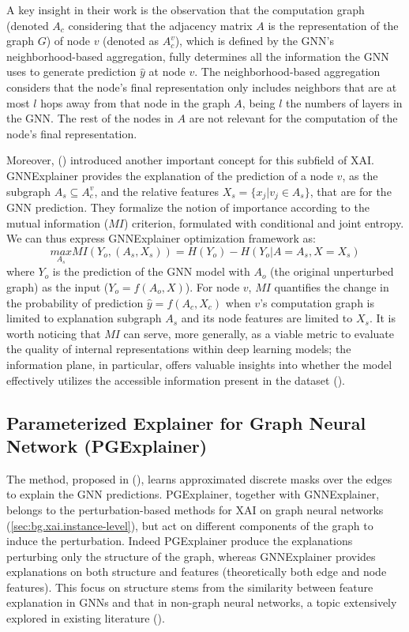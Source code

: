 \documentclass[binding=0.6cm]{sapthesis}
\newcommand{\mycite}[1]{(\cite{#1})}
\begin{document}
A key insight in their work is the observation that the computation graph (denoted $A_c$ considering that the adjacency matrix $A$ is the representation of the graph $G$) of node $v$ (denoted as $A_c^v$), which is defined by the GNN’s neighborhood-based aggregation, fully determines all the information the GNN uses to generate prediction $\hat y$ at node $v$. The neighborhood-based aggregation considers that the node’s final representation only includes neighbors that are at most $l$ hops away from that node in the graph $A$, being $l$ the numbers of layers in the GNN. The rest of the nodes in $A$ are not relevant for the computation of the node’s final representation.

Moreover, \mycite{ying2019-gnnexplainer} introduced another important concept for this subfield of XAI. GNNExplainer provides the explanation of the prediction of a node $v$, as the subgraph $A_s \subseteq A_c^v$, and the relative features $X_s = \{x_j|v_j \in A_s\}$, that are  for the GNN prediction. They formalize the notion of importance according to the mutual information ($MI$) criterion, formulated with conditional and joint entropy. We can thus express GNNExplainer optimization framework as:
\begin{equation}
    \underset{A_s}{max} MI(Y_o,(A_s,X_s)) = H(Y_o) - H(Y_o| A = A_s, X = X_s)
    \label{eq:cfpg.bg.mutual-info-gnn}
\end{equation}
where $Y_o$ is the prediction of the GNN model with $A_o$ (the original unperturbed graph) as the input ($Y_o = f(A_o,X)$). For node $v$, $MI$ quantifies the change in the probability of prediction $\hat y = f(A_c, X_c)$ when $v$’s computation graph is limited to explanation subgraph $A_s$ and its node features are limited to $X_s$. It is worth noticing that $MI$ can serve, more generally, as a viable metric to evaluate the quality of internal representations within deep learning models; the information plane, in particular, offers valuable insights into whether the model effectively utilizes the accessible information present in the dataset \mycite{landsverk2022-mutual-info}.


\subsection{Parameterized Explainer for Graph Neural Network (PGExplainer)}
\label{sec:cfpg.bg.pgexplainer}
The method, proposed in \mycite{luo2020-pgexplainer}, learns approximated discrete masks over the edges to explain the GNN predictions. PGExplainer, together with GNNExplainer, belongs to the perturbation-based methods for XAI on graph neural networks (\cref{sec:bg.xai.instance-level}), but act on different components of the graph to induce the perturbation. Indeed PGExplainer produce the explanations perturbing only the structure of the graph, whereas GNNExplainer provides explanations on both structure and features (theoretically both edge and node features). This focus on structure stems from the similarity between feature explanation in GNNs and that in non-graph neural networks, a topic extensively explored in existing literature \mycite{guo2018-bayesian-non,lundberg2017-AUA,ribeiro2016-lime}.
\end{document}
